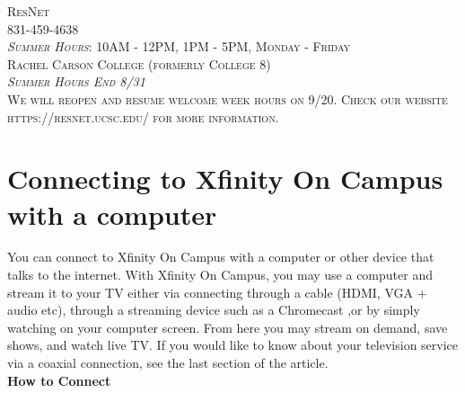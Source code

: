\documentclass[a4paper, 11pt]{article}
\begin{document}
\begin{titlepage}
	{\scshape ResNet \\ 831-459-4638 \\
          \textit{Summer Hours}: 10AM - 12PM, 1PM - 5PM, Monday - Friday \\
          Rachel Carson College (formerly College 8) \\
          \vfill
          \vfill
          \vfill
          \textit{Summer Hours End 8/31}\\ 
          We will reopen and resume welcome week hours on 9/20.  Check our
          website https://resnet.ucsc.edu/ for more information. 
  } %
	
	\vfill %
	

\end{titlepage}




\section*{
  Connecting to Xfinity On Campus with a computer
}

You can connect to Xfinity On Campus with a computer or other device that
talks to the internet. With Xfinity On Campus, you may
use a computer and stream it to your TV either via connecting through a 
cable (HDMI, VGA + audio etc), through a streaming device such as a Chromecast
,or by simply watching on your computer screen.
From here you may stream on demand, save shows, and 
watch live TV. If you would like to know about your television service 
via a coaxial connection, see the last section of the article.\\
{\newline}
\textbf{How to Connect}
\end{document}

